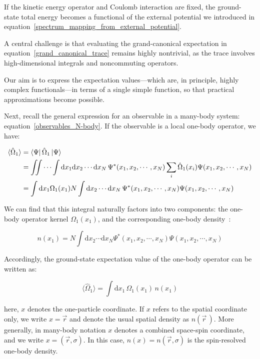 If the kinetic energy operator and Coulomb interaction are fixed, the ground-state total energy becomes a functional of the external potential we introduced in equation~\eqref{spectrum_mapping_from_external_potential}.

A central challenge is that evaluating the grand-canonical expectation in equation~\eqref{grand_canonical_trace} remains highly nontrivial, as the trace involves high-dimensional integrals and noncommuting operators.

Our aim is to express the expectation values—which are, in principle, highly complex functionals—in terms of a single simple function, so that practical approximations become possible.

Next, recall the general expression for an observable in a many-body system: equation~\eqref{observables_N-body}. If the observable is a local one-body operator, we have:

\begin{equation}
\begin{aligned}
    \braket{\hat\Omega_1}
    &= \bra{\Psi}\hat\Omega_1\ket{\Psi} \\
    &= \iint\cdots\int \mathrm{d}x_1\mathrm{d}x_2\cdots\mathrm{d}x_N\,\Psi^*(x_1,x_2,\cdots,x_N)\sum_{i}\hat\Omega_1(x_i)\Psi(x_1,x_2,\cdots,x_N) \\
    &= \int\mathrm{d}x_1\Omega_1(x_1)N\int\mathrm{d}x_2\cdots\mathrm{d}x_N\,\Psi^*(x_1,x_2,\cdots,x_N)\Psi(x_1,x_2,\cdots,x_N)
\end{aligned}
\label{observables_one-body}
\end{equation}

We can find that this integral naturally factors into two components: the one-body operator kernel $\Omega_1(x_1)$,
and the corresponding one-body density~\cite{engel2011density,mazziotti2012two}:

\begin{equation}
    n(x_1)=N\int\mathrm{d}x_2\cdots\mathrm{d}x_N\Psi^*(x_1,x_2,\cdots,x_N)\Psi(x_1,x_2,\cdots,x_N)
\label{one-body_density}
\end{equation}

Accordingly, the ground-state expectation value of the one-body operator can be written as:

\begin{equation}
\langle\hat{\Omega}_1\rangle=\int\mathrm{d}x_1\,\Omega_1(x_1)\,n(x_1)
\label{expectation_one_body_operator}
\end{equation}

here, $x$ denotes the one-particle coordinate.
If $x$ refers to the spatial coordinate only, we write $x=\vec{r}$ and denote the usual spatial density as $n(\vec{r}\,)$.
More generally, in many-body notation $x$ denotes a combined space-spin coordinate, and we write $x=(\vec{r},\sigma)$.
In this case, $n(x)=n(\vec{r},\sigma)$ is the spin-resolved one-body density.

